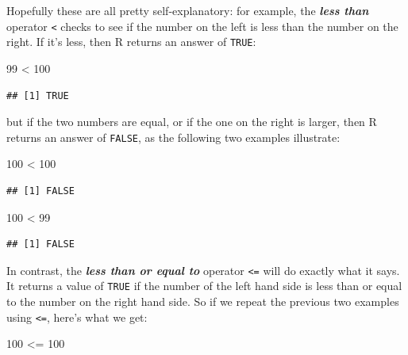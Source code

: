 \documentclass[
]{book}
\newenvironment{Shaded}{\begin{snugshade}}{\end{snugshade}}
\newcommand{\DecValTok}[1]{\textcolor[rgb]{0.00,0.00,0.81}{#1}}
\newcommand{\SpecialCharTok}[1]{\textcolor[rgb]{0.00,0.00,0.00}{#1}}
\begin{document}
Hopefully these are all pretty self-explanatory: for example, the \textbf{\emph{less than}} operator \texttt{\textless{}} checks to see if the number on the left is less than the number on the right. If it's less, then R returns an answer of \texttt{TRUE}:

\begin{Shaded}
\begin{Highlighting}[]
\DecValTok{99} \SpecialCharTok{\textless{}} \DecValTok{100}
\end{Highlighting}
\end{Shaded}

\begin{verbatim}
## [1] TRUE
\end{verbatim}

but if the two numbers are equal, or if the one on the right is larger, then R returns an answer of \texttt{FALSE}, as the following two examples illustrate:

\begin{Shaded}
\begin{Highlighting}[]
\DecValTok{100} \SpecialCharTok{\textless{}} \DecValTok{100}
\end{Highlighting}
\end{Shaded}

\begin{verbatim}
## [1] FALSE
\end{verbatim}

\begin{Shaded}
\begin{Highlighting}[]
\DecValTok{100} \SpecialCharTok{\textless{}} \DecValTok{99}
\end{Highlighting}
\end{Shaded}

\begin{verbatim}
## [1] FALSE
\end{verbatim}

In contrast, the \textbf{\emph{less than or equal to}} operator \texttt{\textless{}=} will do exactly what it says. It returns a value of \texttt{TRUE} if the number of the left hand side is less than or equal to the number on the right hand side. So if we repeat the previous two examples using \texttt{\textless{}=}, here's what we get:

\begin{Shaded}
\begin{Highlighting}[]
\DecValTok{100} \SpecialCharTok{\textless{}=} \DecValTok{100}
\end{Highlighting}
\end{Shaded}
\end{document}
